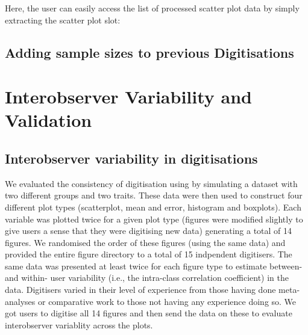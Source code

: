 \documentclass[article]{jss}
\begin{document}
Here, the user can easily access the list of processed scatter plot data by simply extracting the scatter plot slot:

\begin{CodeChunk}
\end{CodeChunk}

\subsection{Adding sample sizes to previous Digitisations}

\section{Interobserver Variability and Validation}
\subsection{Interobserver variability in digitisations}
We evaluated the consistency of digitisation using  by simulating a dataset with two different groups and two traits. These data were then used to construct four different plot types (scatterplot, mean and error, histogram and boxplots). Each variable was plotted twice for a given plot type (figures were modified slightly to give users a sense that they were digitising new data) generating a total of 14 figures. We randomised the order of these figures (using the same data) and provided the entire figure directory to a total of 15 indpendent digitisers. The same data was presented at least twice for each figure type to estimate between- and within- user variability (i.e., the intra-class correlation coefficient) in the data. Digitisers varied in their level of experience from those having done meta-analyses or comparative work to those not having any experience doing so. We got users to digitise all 14 figures and then send the data on these to evaluate interobserver variablity across the plots. 
\end{document}

